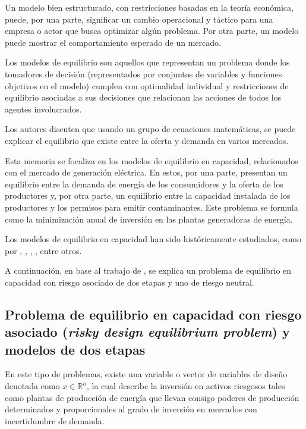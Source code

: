 Un modelo bien estructurado, con restricciones basadas en la teoría económica, puede, por una parte, significar un cambio operacional y táctico para una empresa o actor que busca optimizar algún problema. Por otra parte, un modelo puede mostrar el comportamiento esperado de un mercado.
\vspace{2.5mm}

Los modelos de equilibrio son aquellos que representan un problema donde los tomadores de decisión (representados por conjuntos de variables y funciones objetivos en el modelo) cumplen con optimalidad individual y restricciones de equilibrio asociadas a sus decisiones que relacionan las acciones de todos los agentes involucrados.
\vspace{2.5mm}

Los autores   discuten que usando un grupo de ecuaciones matemáticas, se puede explicar el equilibrio que existe entre la oferta y demanda en varios mercados.
\vspace{2.5mm}

Esta memoria se focaliza en los modelos de equilibrio en capacidad, relacionados con el mercado de generación eléctrica. En estos, por una parte, presentan un equilibrio entre la demanda de energía de los consumidores y la oferta de los productores y, por otra parte, un equilibrio entre la capacidad instalada de los productores y los permisos para emitir contaminantes. Este problema se formula como la minimización anual de inversión en las plantas generadoras de energía.
\vspace{2.5mm}

Los modelos de equilibrio en capacidad han sido históricamente estudiados, como por , , , , entre otros.
\vspace{2.5mm}

A continuación, en base al trabajo de , se explica un problema de equilibrio en capacidad con riesgo asociado de dos etapas y uno de riesgo neutral.

\subsection{Problema de equilibrio en capacidad con riesgo asociado (\textit{risky design equilibrium problem}) y modelos de dos etapas}

En este tipo de problemas, existe una variable o vector de variables de diseño denotada como  $x \in \mathbb{R}^{n}$, la cual describe la inversión en activos riesgosos tales como plantas de producción de energía que llevan consigo poderes de producción determinados y proporcionales al grado de inversión en mercados con incertidumbre de demanda.
\vspace{2.5mm}

